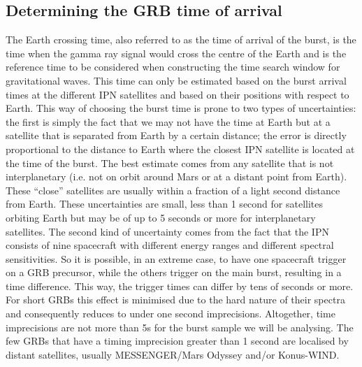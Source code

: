 \documentclass[a4paper]{jpconf}
\begin{document}
\subsection{Determining the GRB time of arrival}

The Earth crossing time, also referred to as the time of arrival of the burst, is the time when the gamma ray signal would cross the centre of the Earth and is the reference time to be considered when constructing the time search window for gravitational waves. 
This time can only be estimated based on the burst arrival times at the different IPN satellites and based on their positions with respect to Earth. This way of choosing the burst time is prone to two types of uncertainties: the first is simply the fact that we may not have the time at Earth but at a satellite that is separated from Earth by a certain distance; the error is directly proportional to the distance to Earth where the closest IPN satellite is located at the time of the burst. The best estimate comes from any satellite that is not interplanetary (i.e. not on orbit around Mars or at a distant point from Earth).  These ``close'' satellites are usually within a fraction of a light second distance from Earth.  These uncertainties are small, less than 1 second for satellites orbiting Earth but may be of up to 5 seconds or more for interplanetary satellites. The second kind of uncertainty comes from the fact that the IPN consists of nine spacecraft with different energy ranges and different spectral sensitivities. So it is possible, in an extreme case, to have one spacecraft trigger on a GRB precursor, while the others trigger on the main burst, resulting in a time difference.  This way, the trigger times can differ by tens of seconds or more.  For short GRBs this effect is minimised due to the hard nature of their spectra and consequently reduces to under one second imprecisions. Altogether, time imprecisions are not more than 5s for the burst sample we will be analysing. The few GRBs that have a timing imprecision greater than 1 second are localised by distant satellites, usually MESSENGER/Mars Odyssey and/or Konus-WIND.
\end{document}
